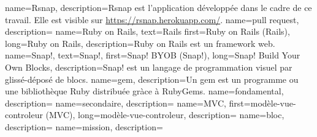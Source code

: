 

{
 name=Rsnap,
 description={Rsnap \cite{rsnap} est l'application développée dans le cadre de ce travail. Elle est visible sur \url{https://rsnap.herokuapp.com/}.}
}
{
 name={pull request},
 description={}
}
{
 name={Ruby on Rails},
 text={Rails}
 first={Ruby on Rails (Rails)},
 long={Ruby on Rails},
 description={Ruby on Rails \cite{rails} est un framework web.}
}
{
 name={Snap!},
 text={Snap!},
 first={Snap! BYOB (Snap!)},
 long={Snap! Build Your Own Blocks},
 description={Snap! \cite{snap} est un langage de programmation visuel par glissé-déposé de blocs.}
}
{
 name={gem},
 description={Un gem \cite{gem} est un programme ou une bibliothèque Ruby distribuée gràce à RubyGems.}
}
{
 name={fondamental},
 description={}
}
{
 name={secondaire},
 description={}
}
{
 name={MVC},
 first={modèle-vue-controleur (MVC)},
 long={modèle-vue-controleur},
 description={}
}
{
 name={bloc},
 description={}
}
{
 name={mission},
 description={}
}
